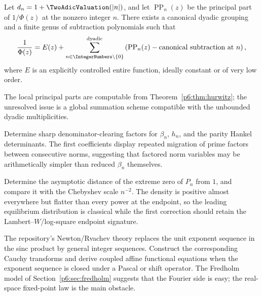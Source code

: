 \documentclass[11pt]{article}
\theoremstyle{definition}
\theoremstyle{remark}
\begin{document}
\begin{conjecture}\label{p6:conj:ML}
Let \(d_n=1+\TwoAdicValuation(|n|)\), and let \(\operatorname{PP}_n(z)\) be the principal part of
\(1/\Phi(z)\) at the nonzero integer \(n\).  There exists a canonical dyadic grouping and a
finite genus of subtraction polynomials such that
\begin{equation}
 \frac1{\Phi(z)}
 =E(z)+\sum_{n\in\IntegerNumbers\setminus\{0\}}^{\mathrm{dyadic}}
 \left(\operatorname{PP}_n(z)-\text{canonical subtraction at }n\right), \label{p6:eq:ML-conj}
\end{equation}
where \(E\) is an explicitly controlled entire function, ideally constant or of very low
order.
\end{conjecture}

The local principal parts are computable from Theorem~\ref{p6:thm:hurwitz}; the unresolved
issue is a global summation scheme compatible with the unbounded dyadic multiplicities.

\begin{openproblem}
Determine sharp denominator-clearing factors for \(\beta_n\), \(h_n\), and the parity
Hankel determinants.  The first coefficients display repeated migration of prime factors
between consecutive norms, suggesting that factored norm variables may be arithmetically
simpler than reduced \(\beta_n\) themselves.
\end{openproblem}

\begin{openproblem}
Determine the asymptotic distance of the extreme zero of \(P_n\) from \(1\), and compare it
with the Chebyshev scale \(n^{-2}\).  The density is positive almost everywhere but flatter
than every power at the endpoint, so the leading equilibrium distribution is classical
while the first correction should retain the Lambert--\(W\)/log-square endpoint signature.
\end{openproblem}

\begin{openproblem}
The repository's Newton/Rvachev theory replaces the unit exponent sequence in the sinc
product by general integer sequences.  Construct the corresponding Cauchy transforms and
derive coupled affine functional equations when the exponent sequence is closed under a
Pascal or shift operator.  The Fredholm model of Section~\ref{p6:sec:fredholm} suggests that
the Fourier side is easy; the real-space fixed-point law is the main obstacle.
\end{openproblem}
\end{document}
